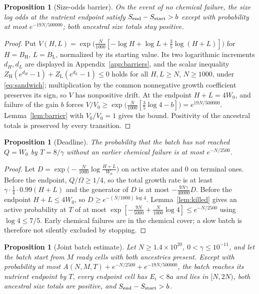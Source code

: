 \documentclass[11pt,a4paper]{article}
\theoremstyle{plain}
\newtheorem{proposition}[theorem]{Proposition}
\theoremstyle{definition}
\theoremstyle{remark}
\newcommand{\lo}{\mathrm L}
\newcommand{\hi}{\mathrm H}
\begin{document}
\begin{proposition}[Size-odds barrier]\label{prop:odds}
On the event of no chemical failure, the size log odds at the nutrient endpoint satisfy $S_{\rm end}-S_{\rm start}>b$ except with probability at most $e^{-19N/500000}$; both ancestral size totals stay positive.
\end{proposition}

\begin{proof}
Put $V(H,L)=\exp\bigl(\frac N{1000}[-\log H+\log L+\frac35\log(H+L)]\bigr)$ for $H=B_\hi$, $L=B_\lo$, normalized by its starting value. Its two logarithmic increments $d_H,d_L$ are displayed in Appendix~\ref{app:barriers}, and the scalar inequality $Z_\hi(e^{d_H}-1)+Z_\lo(e^{d_L}-1)\le0$ holds for all $H,L\ge N$, $N\ge1000$, under \eqref{eq:sandwich}; multiplication by the common nonnegative growth coefficient preserves its sign, so $V$ has nonpositive drift. At the endpoint $H+L=4W_0$, and failure of the gain $b$ forces $V/V_0\ge\exp\bigl(\frac N{1000}[\frac35\log4-b]\bigr)=e^{19N/500000}$. Lemma~\ref{lem:barrier} with $V_0/V_0=1$ gives the bound. Positivity of the ancestral totals is preserved by every transition.
\end{proof}

\begin{proposition}[Deadline]\label{prop:deadline}
The probability that the batch has not reached $Q=W_0$ by $T=8/\gamma$ without an earlier chemical failure is at most $e^{-N/2500}$.
\end{proposition}

\begin{proof}
Let $D=\exp\bigl(-\frac N{1000}\log\frac{H+L}{W_0}\bigr)$ on active states and $0$ on terminal ones. Before the endpoint, $Q/\Omega\ge1/4$, so the total growth rate is at least $\gamma\cdot\frac14\cdot0.99(H+L)$ and the generator of $D$ is at most $-\frac{9N\gamma}{40000}D$. Before the endpoint $H+L\le4W_0$, so $D\ge e^{-(N/1000)\log4}$. Lemma~\ref{lem:killed} gives an active probability at $T$ of at most $\exp[-\frac{9N}{5000}+\frac N{1000}\log4]\le e^{-N/2500}$ using $\log4\le7/5$. Early chemical failures are in the chemical cover; a slow batch is therefore not silently excluded by stopping.
\end{proof}

\begin{proposition}[Joint batch estimate]\label{prop:batch}
Let $N\ge1.4\times10^{20}$, $0<\gamma\le10^{-11}$, and let the batch start from $M$ ready cells with both ancestries present. Except with probability at most $A(N,M,T)+e^{-N/2500}+e^{-19N/500000}$, the batch reaches its nutrient endpoint by $T$, every endpoint cell has $E_i<8a$ and lies in $[N,2N)$, both ancestral size totals are positive, and $S_{\rm end}-S_{\rm start}>b$.
\end{proposition}
\end{document}
